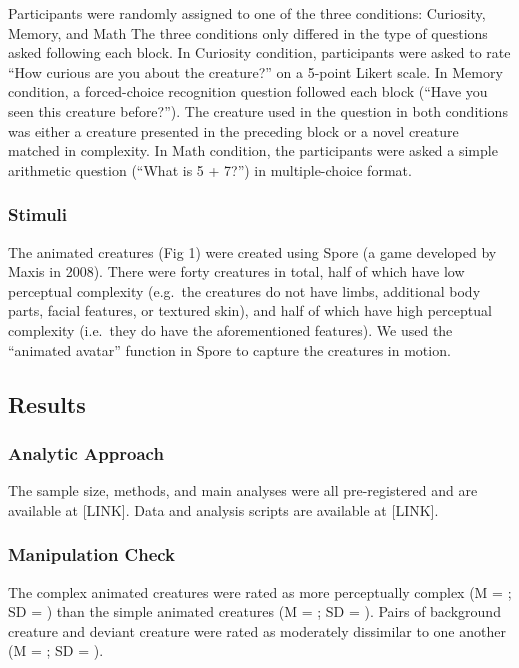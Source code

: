 \documentclass[10pt, letterpaper]{article}
\begin{document}
Participants were randomly assigned to one of the three conditions:
Curiosity, Memory, and Math The three conditions only differed in the
type of questions asked following each block. In Curiosity condition,
participants were asked to rate ``How curious are you about the
creature?'' on a 5-point Likert scale. In Memory condition, a
forced-choice recognition question followed each block (``Have you seen
this creature before?''). The creature used in the question in both
conditions was either a creature presented in the preceding block or a
novel creature matched in complexity. In Math condition, the
participants were asked a simple arithmetic question (``What is 5 +
7?'') in multiple-choice format.

\hypertarget{stimuli}{%
\subsubsection{Stimuli}\label{stimuli}}

The animated creatures (Fig 1) were created using Spore (a game
developed by Maxis in 2008). There were forty creatures in total, half
of which have low perceptual complexity (e.g.~the creatures do not have
limbs, additional body parts, facial features, or textured skin), and
half of which have high perceptual complexity (i.e.~they do have the
aforementioned features). We used the ``animated avatar'' function in
Spore to capture the creatures in motion.

\hypertarget{results}{%
\subsection{Results}\label{results}}

\hypertarget{analytic-approach}{%
\subsubsection{Analytic Approach}\label{analytic-approach}}

The sample size, methods, and main analyses were all pre-registered and
are available at {[}LINK{]}. Data and analysis scripts are available at
{[}LINK{]}.

\hypertarget{manipulation-check}{%
\subsubsection{Manipulation Check}\label{manipulation-check}}

The complex animated creatures were rated as more perceptually complex
(M = ; SD = ) than the simple animated creatures (M = ; SD = ). Pairs of
background creature and deviant creature were rated as moderately
dissimilar to one another (M = ; SD = ).
\end{document}
